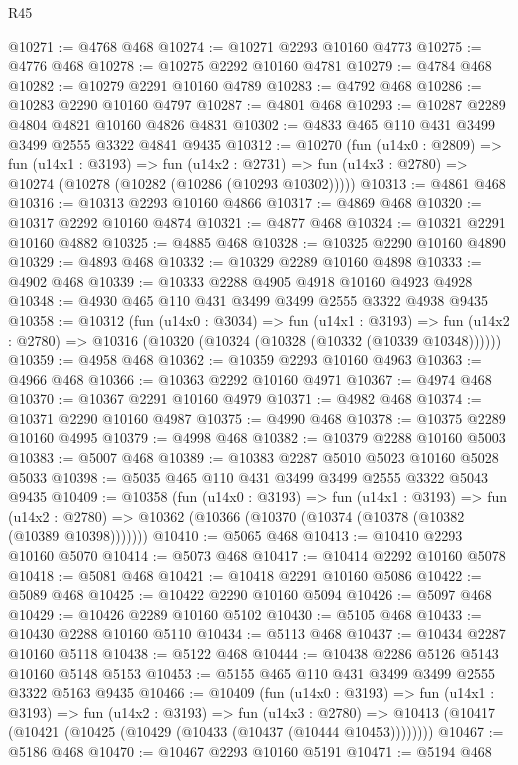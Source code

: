 \begin{lexlean}{R45}
\begin{coremodule}
@10271 := @4768 @468
@10274 := @10271 @2293 @10160 @4773
@10275 := @4776 @468
@10278 := @10275 @2292 @10160 @4781
@10279 := @4784 @468
@10282 := @10279 @2291 @10160 @4789
@10283 := @4792 @468
@10286 := @10283 @2290 @10160 @4797
@10287 := @4801 @468
@10293 := @10287 @2289 @4804 @4821 @10160 @4826 @4831
@10302 := @4833 @465 @110 @431 @3499 @3499 @2555 @3322 @4841 @9435
@10312 := @10270
    (fun (u14x0 : @2809) =>
    fun (u14x1 : @3193) =>
    fun (u14x2 : @2731) => fun (u14x3 : @2780) => @10274 (@10278 (@10282 (@10286 (@10293 @10302)))))
@10313 := @4861 @468
@10316 := @10313 @2293 @10160 @4866
@10317 := @4869 @468
@10320 := @10317 @2292 @10160 @4874
@10321 := @4877 @468
@10324 := @10321 @2291 @10160 @4882
@10325 := @4885 @468
@10328 := @10325 @2290 @10160 @4890
@10329 := @4893 @468
@10332 := @10329 @2289 @10160 @4898
@10333 := @4902 @468
@10339 := @10333 @2288 @4905 @4918 @10160 @4923 @4928
@10348 := @4930 @465 @110 @431 @3499 @3499 @2555 @3322 @4938 @9435
@10358 := @10312
    (fun (u14x0 : @3034) =>
    fun (u14x1 : @3193) =>
    fun (u14x2 : @2780) => @10316 (@10320 (@10324 (@10328 (@10332 (@10339 @10348))))))
@10359 := @4958 @468
@10362 := @10359 @2293 @10160 @4963
@10363 := @4966 @468
@10366 := @10363 @2292 @10160 @4971
@10367 := @4974 @468
@10370 := @10367 @2291 @10160 @4979
@10371 := @4982 @468
@10374 := @10371 @2290 @10160 @4987
@10375 := @4990 @468
@10378 := @10375 @2289 @10160 @4995
@10379 := @4998 @468
@10382 := @10379 @2288 @10160 @5003
@10383 := @5007 @468
@10389 := @10383 @2287 @5010 @5023 @10160 @5028 @5033
@10398 := @5035 @465 @110 @431 @3499 @3499 @2555 @3322 @5043 @9435
@10409 := @10358
    (fun (u14x0 : @3193) =>
    fun (u14x1 : @3193) =>
    fun (u14x2 : @2780) => @10362 (@10366 (@10370 (@10374 (@10378 (@10382 (@10389 @10398)))))))
@10410 := @5065 @468
@10413 := @10410 @2293 @10160 @5070
@10414 := @5073 @468
@10417 := @10414 @2292 @10160 @5078
@10418 := @5081 @468
@10421 := @10418 @2291 @10160 @5086
@10422 := @5089 @468
@10425 := @10422 @2290 @10160 @5094
@10426 := @5097 @468
@10429 := @10426 @2289 @10160 @5102
@10430 := @5105 @468
@10433 := @10430 @2288 @10160 @5110
@10434 := @5113 @468
@10437 := @10434 @2287 @10160 @5118
@10438 := @5122 @468
@10444 := @10438 @2286 @5126 @5143 @10160 @5148 @5153
@10453 := @5155 @465 @110 @431 @3499 @3499 @2555 @3322 @5163 @9435
@10466 := @10409
    (fun (u14x0 : @3193) =>
    fun (u14x1 : @3193) =>
    fun (u14x2 : @3193) =>
    fun (u14x3 : @2780) =>
    @10413 (@10417 (@10421 (@10425 (@10429 (@10433 (@10437 (@10444 @10453))))))))
@10467 := @5186 @468
@10470 := @10467 @2293 @10160 @5191
@10471 := @5194 @468

\end{coremodule}
\end{lexlean}
